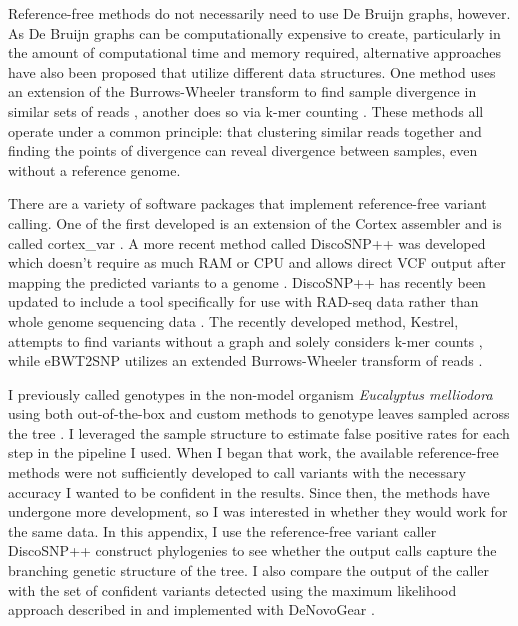 Reference-free methods do not necessarily need to use De Bruijn graphs, however. As De Bruijn graphs can be computationally expensive to create, particularly in the amount of computational time and memory required, alternative approaches have also been proposed that utilize different data structures. One method uses an extension of the Burrows-Wheeler transform to find sample divergence in similar sets of reads \parencite{prezza_snps_2019}, another does so via k-mer counting \parencite{audano_mapping-free_2018}. These methods all operate under a common  principle: that clustering similar reads together and finding the points of divergence can reveal divergence between samples, even without a reference genome.

There are a variety of software packages that implement reference-free variant calling. One of the first developed is an extension of the Cortex assembler and is called cortex\_var \parencite{iqbal_novo_2012}. A more recent method called DiscoSNP++ was developed which doesn't require as much RAM or CPU and allows direct VCF output after mapping the predicted variants to a genome \parencite{peterlongo_discosnp_2017}. DiscoSNP++ has recently been updated to include a tool specifically for use with RAD-seq data rather than whole genome sequencing data \parencite{gauthier_discosnp-rad_2020}. The recently developed method, Kestrel, attempts to find variants without a graph and solely considers k-mer counts \parencite{audano_mapping-free_2018}, while eBWT2SNP \parencite{prezza_snps_2019} utilizes an extended Burrows-Wheeler transform of reads \parencite{mantaci_extension_2007}.

I previously called genotypes in the non-model organism \textit{Eucalyptus melliodora} using both out-of-the-box and custom methods to genotype leaves sampled across the tree \parencite{orr_phylogenomic_2020}. I leveraged the sample structure to estimate false positive rates for each step in the pipeline I used. When I began that work, the available reference-free methods were not sufficiently developed to call variants with the necessary accuracy I wanted to be confident in the results. Since then, the methods have undergone more development, so I was interested in whether they would work for the same data. In this appendix, I use the reference-free variant caller DiscoSNP++ \parencite{peterlongo_discosnp_2017} construct phylogenies to see whether the output calls capture the branching genetic structure of the tree. I also compare the output of the caller with the set of confident variants detected using the maximum likelihood approach described in \parencite{orr_phylogenomic_2020} and implemented with DeNovoGear \parencite{ramu_denovogear_2013}.

